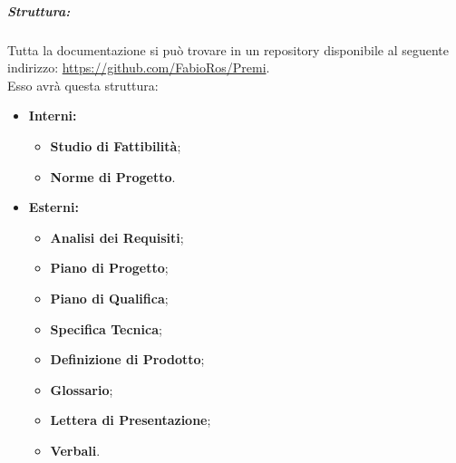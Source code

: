 	\subparagraph{Struttura:}
	Tutta la documentazione si può trovare in un \gls{repository} disponibile al seguente indirizzo: \url{https://github.com/FabioRos/Premi}. \\
	Esso avrà questa struttura:
	\begin{itemize}
		\item \textbf{Interni:}
			\begin{itemize}
				\item \textbf{Studio di Fattibilità};
				\item \textbf{Norme di Progetto}.
			\end{itemize}
		\item \textbf{Esterni:}
			\begin{itemize}
				\item \textbf{Analisi dei Requisiti};
				\item \textbf{Piano di Progetto};
				\item \textbf{Piano di Qualifica};
				\item \textbf{Specifica Tecnica};
				\item \textbf{Definizione di Prodotto};
				\item \textbf{Glossario};
				\item \textbf{Lettera di Presentazione};
				\item \textbf{Verbali}.
			\end{itemize}
	\end{itemize}
	
